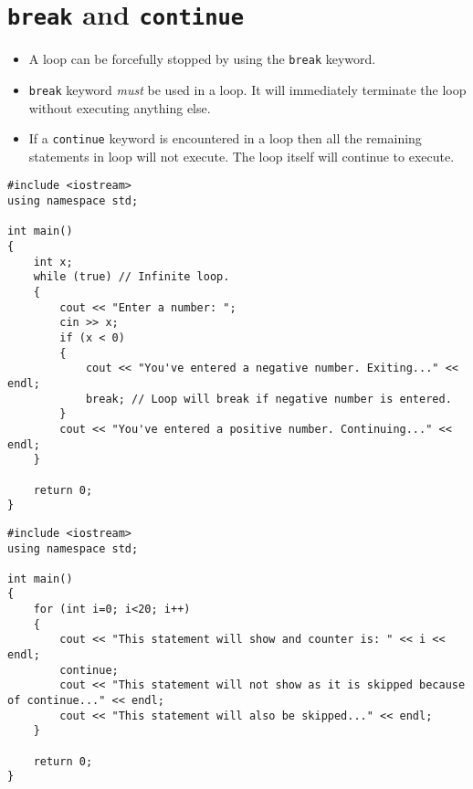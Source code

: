 \documentclass[12pt,a4paper]{article}
\begin{document}
\section{\texttt{break} and \texttt{continue}}
\begin{itemize}
\item A loop can be forcefully stopped by using the \verb|break| keyword.
\item \verb|break| keyword \emph{must} be used in a loop. It will immediately terminate the loop without executing anything else.
\item If a \verb|continue| keyword is encountered in a loop then all the remaining statements in loop will not execute. The loop itself will continue to execute.
\end{itemize}
\begin{lstlisting}[caption={Breaking a Loop}]
#include <iostream>
using namespace std;

int main()
{
	int x;
	while (true) // Infinite loop.
	{
		cout << "Enter a number: ";
		cin >> x;
		if (x < 0)
		{
			cout << "You've entered a negative number. Exiting..." << endl;
			break; // Loop will break if negative number is entered.
		}
		cout << "You've entered a positive number. Continuing..." << endl;
	}
	
	return 0;
}
\end{lstlisting}
\begin{lstlisting}[caption={Using continue in a Loop}]
#include <iostream>
using namespace std;

int main()
{
	for (int i=0; i<20; i++)
	{
		cout << "This statement will show and counter is: " << i << endl;
		continue;
		cout << "This statement will not show as it is skipped because of continue..." << endl;
		cout << "This statement will also be skipped..." << endl;
	}
	
	return 0;
}
\end{lstlisting}
\end{document}
